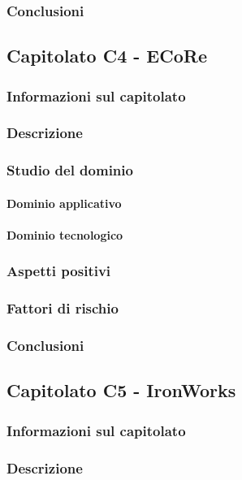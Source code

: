 		\subsubsection{Conclusioni}
	
	\subsection{Capitolato C4 - ECoRe}
		\subsubsection{Informazioni sul capitolato}
		\subsubsection{Descrizione}
		\subsubsection{Studio del dominio}
			\paragraph{Dominio applicativo}
			\paragraph{Dominio tecnologico}
		\subsubsection{Aspetti positivi}
		\subsubsection{Fattori di rischio}
		\subsubsection{Conclusioni}
	
		\subsection{Capitolato C5 - IronWorks}
	\subsubsection{Informazioni sul capitolato}
	\subsubsection{Descrizione}
